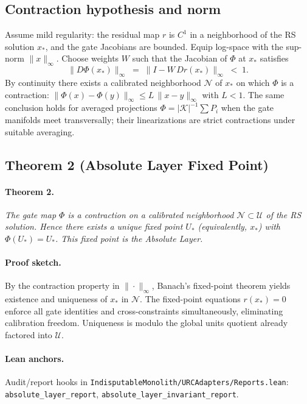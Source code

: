 \documentclass[11pt]{article}
\begin{document}
\subsection{Contraction hypothesis and norm}
Assume mild regularity: the residual map \(r\) is \(C^1\) in a neighborhood of the RS solution \(x_*\), and the gate Jacobians are bounded. Equip log\mbox{-}space with the sup\mbox{-}norm \(\|x\|_\infty\). Choose weights \(W\) such that the Jacobian of \(\Phi\) at \(x_*\) satisfies
\[
  \| D\Phi(x_*) \|_\infty \;=\; \| I - W\, D r(x_*) \|_\infty \;<\; 1.
\]
By continuity there exists a calibrated neighborhood \(\mathcal{N}\) of \(x_*\) on which \(\Phi\) is a contraction: \(\|\Phi(x)-\Phi(y)\|_\infty \le L\,\|x-y\|_\infty\) with \(L<1\). The same conclusion holds for averaged projections \(\Phi=|\mathcal{K}|^{-1}\sum P_i\) when the gate manifolds meet transversally; their linearizations are strict contractions under suitable averaging.

\subsection{Theorem 2 (Absolute Layer Fixed Point)}
\paragraph{Theorem 2.} \emph{The gate map \(\Phi\) is a contraction on a calibrated neighborhood \(\mathcal{N}\subset \mathcal{U}\) of the RS solution. Hence there exists a unique fixed point \(U_*\) (equivalently, \(x_*\)) with \(\Phi(U_*)=U_*\). This fixed point is the Absolute Layer.}

\paragraph{Proof sketch.} By the contraction property in \(\|\cdot\|_\infty\), Banach's fixed\mbox{-}point theorem yields existence and uniqueness of \(x_*\) in \(\mathcal{N}\). The fixed\mbox{-}point equations \(r(x_*)=0\) enforce all gate identities and cross\mbox{-}constraints simultaneously, eliminating calibration freedom. Uniqueness is modulo the global units quotient already factored into \(\mathcal{U}\).

\paragraph{Lean anchors.} Audit/report hooks in \texttt{IndisputableMonolith/URCAdapters/Reports.lean}: \texttt{absolute\_layer\_report}, \texttt{absolute\_layer\_invariant\_report}.
\end{document}
